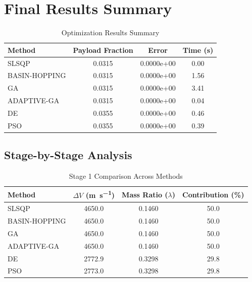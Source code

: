 \documentclass{article}
\begin{document}
\section{Final Results Summary}
\begin{table}[H]
\centering
\caption{Optimization Results Summary}
\begin{tabular}{lS[table-format=1.4]S[table-format=1.4e-1]S[table-format=1.2]}
\toprule
Method & {Payload Fraction} & {Error} & {Time (\si{\second})} \\
\midrule
SLSQP        & 0.0315 & 0.0000e+00 & 0.00 \\
BASIN-HOPPING & 0.0315 & 0.0000e+00 & 1.56 \\
GA           & 0.0315 & 0.0000e+00 & 3.41 \\
ADAPTIVE-GA  & 0.0315 & 0.0000e+00 & 0.04 \\
DE           & 0.0355 & 0.0000e+00 & 0.46 \\
PSO          & 0.0355 & 0.0000e+00 & 0.39 \\
\bottomrule
\end{tabular}
\end{table}

\subsection{Stage-by-Stage Analysis}


\begin{table}[H]
\centering
\caption{Stage 1 Comparison Across Methods}
\begin{tabular}{lS[table-format=4.1]S[table-format=1.4]S[table-format=3.1]}
\toprule
Method & {$\Delta V$ (\si{\meter\per\second})} & {Mass Ratio ($\lambda$)} & {Contribution (\%)} \\
\midrule
SLSQP        & 4650.0 & 0.1460 & 50.0 \\
BASIN-HOPPING & 4650.0 & 0.1460 & 50.0 \\
GA           & 4650.0 & 0.1460 & 50.0 \\
ADAPTIVE-GA  & 4650.0 & 0.1460 & 50.0 \\
DE           & 2772.9 & 0.3298 & 29.8 \\
PSO          & 2773.0 & 0.3298 & 29.8 \\
\bottomrule
\end{tabular}
\end{table}
\end{document}
